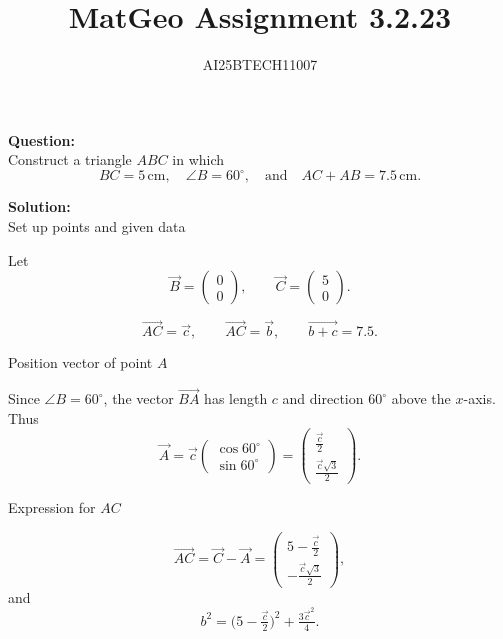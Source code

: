 \documentclass[journal]{IEEEtran}
\begin{document}

\vspace{3cm}

\title{MatGeo Assignment 3.2.23}
\author{AI25BTECH11007}
 \maketitle
{\let\newpage\relax\maketitle}

\renewcommand{\thefigure}{\theenumi}
\renewcommand{\thetable}{\theenumi}
\setlength{\intextsep}{10pt} %


\renewcommand{\thetable}{\theenumi}
\textbf{Question:}\\

Construct a triangle $ABC$ in which 
\[
BC = 5 \,\text{cm}, \quad \angle B = 60^\circ, \quad \text{and} \quad AC + AB = 7.5 \,\text{cm}.
\]


\textbf{Solution:}\\
\bigskip
 Set up points and given data

Let
\[
\vec{B}=\begin{pmatrix}0\\0\end{pmatrix}, \qquad
\vec{C}=\begin{pmatrix}5\\0\end{pmatrix}.
\]


\[
\vec{AC} = \vec{c}, \qquad \vec{AC} = \vec{b}, \qquad \vec{b+c}=7.5.
\]

 Position vector of point $A$

Since $\angle B=60^\circ$, the vector $\vec{BA}$ has length $c$ and direction $60^\circ$ above the $x$-axis. Thus
\[
\vec{A} = \vec{c}
\begin{pmatrix}\cos 60^\circ \\ \sin 60^\circ\end{pmatrix}
= \begin{pmatrix}\tfrac{\vec{c}}{2}\\[4pt]\tfrac{\vec{c}\sqrt{3}}{2}\end{pmatrix}.
\]

 Expression for $AC$

\[
\vec{AC} = \vec{C} - \vec{A}
= \begin{pmatrix}5-\tfrac{\vec{c}}{2}\\[4pt]-\tfrac{\vec{c}\sqrt{3}}{2}\end{pmatrix},
\]
and
\[
b^2 = \Big(5-\tfrac{\vec{c}}{2}\Big)^2 + \tfrac{3\vec{c}^2}{4}.
\]
\end{document}

